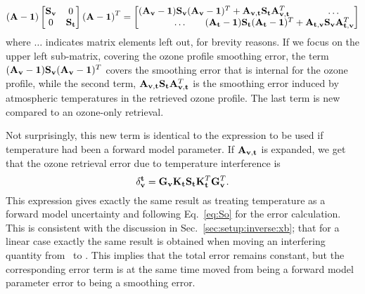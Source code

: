 \begin{displaymath}
  \left(\AvrKrnMtr-\IdnMtr\right)
  \begin{bmatrix}
    \aCvrMtr{\VctStl{v}} & 0 \\
    0 & \aCvrMtr{\VctStl{t}} 
  \end{bmatrix} 
  \left(\AvrKrnMtr-\IdnMtr\right)^T =
  \begin{bmatrix}
    (\AvrKrnMtr_{\VctStl{v}}-\IdnMtr)\aCvrMtr{\VctStl{v}}
    (\AvrKrnMtr_{\VctStl{v}}-\IdnMtr)^T + 
    \AvrKrnMtr_{\VctStl{v},\VctStl{t}}\aCvrMtr{\VctStl{t}}\AvrKrnMtr_{\VctStl{v},\VctStl{t}}^T
    & \hspace{5mm}\dots \\
    \hspace{-25mm}\dots & \hspace{-35mm}%
    (\AvrKrnMtr_{\VctStl{t}}-\IdnMtr)\aCvrMtr{\VctStl{t}}
    (\AvrKrnMtr_{\VctStl{t}}-\IdnMtr)^T + 
    \AvrKrnMtr_{\VctStl{t},\VctStl{v}}\aCvrMtr{\VctStl{v}}\AvrKrnMtr_{\VctStl{t},\VctStl{v}}^T
  \end{bmatrix} 
\end{displaymath}
where $\dots$ indicates matrix elements left out, for brevity reasons. If we
focus on the upper left sub-matrix, covering the ozone profile smoothing error,
the term $(\mathbf{A}_{\mathbf{v}}-\mathbf{1})\mathbf{S}_{\mathbf{v}}
(\mathbf{A}_{\mathbf{v}}-\mathbf{1})^T$ covers the smoothing error that is
internal for the ozone profile, while the second term,
$\mathbf{A}_{\mathbf{v},\mathbf{t}}\mathbf{S}_{\mathbf{t}}\mathbf{A}_{\mathbf{v},\mathbf{t}}^T$
is the smoothing error induced by atmospheric temperatures in the retrieved
ozone profile. The last term is new compared to an ozone-only retrieval.

Not surprisingly, this new term is identical to the expression to be used if
temperature had been a forward model parameter. If
$\mathbf{A}_{\mathbf{v},\mathbf{t}}$ is expanded, we get that the ozone retrieval
error due to temperature interference is \citep{rodgers2003intercomparison}
\begin{displaymath}
  \delta_{\mathbf{v}}^{\mathbf{t}} =
  \mathbf{G}_{\mathbf{v}}\mathbf{K}_{\mathbf{t}}\mathbf{S}_{\mathbf{t}}
   \mathbf{K}_{\mathbf{t}}^T\mathbf{G}_{\mathbf{v}}^T.
\end{displaymath}
This expression gives exactly the same result as treating temperature as a
forward model uncertainty and following Eq.~\ref{eq:So} for the error
calculation. This is consistent with the discussion in
Sec.~\ref{sec:setup:inverse:xb}; that for a linear case exactly the same result
is obtained when moving an interfering quantity from \FrwMdlVct\ to \SttVct.
This implies that the total error remains constant, but the corresponding error
term is at the same time moved from being a forward model parameter error to
being a smoothing error. 

